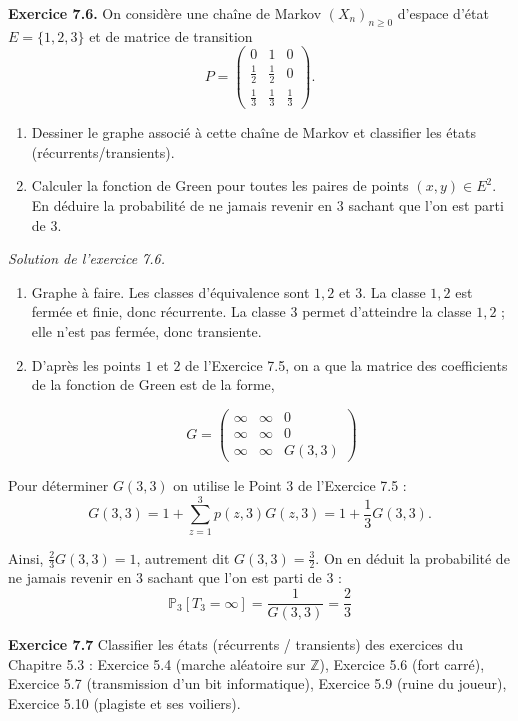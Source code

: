 \noindent\textbf{Exercice 7.6.}
On considère une chaîne de Markov $(X_n)_{n \geq 0}$ d’espace d’état $E = \{1, 2, 3\}$ et de matrice de transition 
\[
P = 
\begin{pmatrix}
0 & 1 & 0 \\
\frac{1}{2} & \frac{1}{2} & 0 \\
\frac{1}{3} & \frac{1}{3} & \frac{1}{3}
\end{pmatrix}.
\]

\begin{enumerate}
    \item Dessiner le graphe associé à cette chaîne de Markov et classifier les états (récurrents/transients).
    \item Calculer la fonction de Green pour toutes les paires de points $(x, y) \in E^2$. En déduire la probabilité de ne jamais revenir en $3$ sachant que l’on est parti de $3$.
\end{enumerate}

\noindent \textit{Solution de l’exercice 7.6.}\\
\begin{enumerate}
    \item Graphe à faire. Les classes d’équivalence sont ${1, 2}$ et ${3}$. La classe ${1, 2}$ est fermée et finie, donc récurrente. La classe ${3}$ permet d’atteindre la classe ${1, 2}$ ; elle n’est pas fermée, donc transiente.
    \item  D’après les points $1$ et $2$ de l’Exercice 7.5, on a que la matrice des coefficients de la fonction de Green est de la forme,

    \[
    G = 
    \begin{pmatrix}
        \infty & \infty & 0 \\
        \infty & \infty & 0 \\
        \infty & \infty & G(3, 3)
    \end{pmatrix}
    \]
\end{enumerate}
\noindent Pour déterminer $G(3, 3)$ on utilise le Point 3 de l’Exercice 7.5 :
\[
G(3, 3) = 1 + \sum^{3}_{z=1}p(z, 3)G(z, 3) = 1 + \frac{1}{3}G(3, 3).
\]

\noindent Ainsi, $\frac{2}{3}G(3, 3) = 1$, autrement dit $G(3, 3) = \frac{3}{2}$. On en déduit la probabilité de ne jamais revenir en $3$ sachant que l’on est parti de $3$ :
\[
\mathbb{P}_3[T_3 = \infty] = \frac{1}{G(3, 3)} = \frac{2}{3}
\]


\noindent \textbf{Exercice 7.7} Classifier les états (récurrents / transients) des exercices du Chapitre 5.3 : Exercice 5.4 (marche aléatoire sur $\mathbb{Z}$), Exercice 5.6 (fort carré), Exercice 5.7 (transmission d’un bit informatique), Exercice 5.9 (ruine du joueur), Exercice 5.10 (plagiste et ses voiliers).\\

